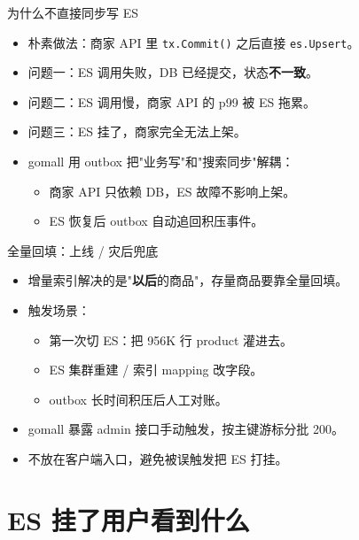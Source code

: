 \begin{frame}{为什么不直接同步写 ES}
\begin{itemize}
  \item 朴素做法：商家 API 里 \texttt{tx.Commit()} 之后直接 \texttt{es.Upsert}。
  \item 问题一：ES 调用失败，DB 已经提交，状态\textbf{不一致}。
  \item 问题二：ES 调用慢，商家 API 的 p99 被 ES 拖累。
  \item 问题三：ES 挂了，商家完全无法上架。
  \item gomall 用 outbox 把"业务写"和"搜索同步"解耦：
  \begin{itemize}
    \item 商家 API 只依赖 DB，ES 故障不影响上架。
    \item ES 恢复后 outbox 自动追回积压事件。
  \end{itemize}
\end{itemize}
\end{frame}

\begin{frame}{全量回填：上线 / 灾后兜底}
\begin{itemize}
  \item 增量索引解决的是"\textbf{以后}的商品"，存量商品要靠全量回填。
  \item 触发场景：
  \begin{itemize}
    \item 第一次切 ES：把 956K 行 product 灌进去。
    \item ES 集群重建 / 索引 mapping 改字段。
    \item outbox 长时间积压后人工对账。
  \end{itemize}
  \item gomall 暴露 admin 接口手动触发，按主键游标分批 200。
  \item 不放在客户端入口，避免被误触发把 ES 打挂。
\end{itemize}
\end{frame}

\section{ES 挂了用户看到什么}

